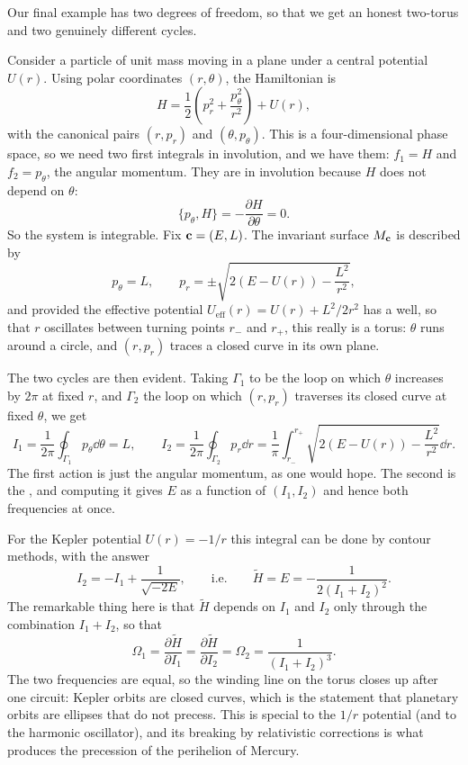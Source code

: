 \documentclass[a4paper]{scrartcl}
\begin{document}
Our final example has two degrees of freedom, so that we get an honest two-torus and two genuinely different cycles.

\begin{example}
	Consider a particle of unit mass moving in a plane under a central potential $U(r)$. Using polar coordinates $(r, \theta)$, the Hamiltonian is
	$$
	H = \frac{1}{2}\left(p_r^2 + \frac{p_\theta^2}{r^2}\right) + U(r),
	$$
	with the canonical pairs $(r, p_r)$ and $(\theta, p_\theta)$. This is a four-dimensional phase space, so we need two first integrals in involution, and we have them: $f_1 = H$ and $f_2 = p_\theta$, the angular momentum. They are in involution because $H$ does not depend on $\theta$:
	$$
	\{p_\theta, H\} = -\frac{\partial H}{\partial \theta} = 0.
	$$
	So the system is integrable. Fix $\mathbf{c} = (E, L)$. The invariant surface $M_{\mathbf{c}}$ is described by
	$$
	p_\theta = L, \qquad p_r = \pm\sqrt{2(E - U(r)) - \frac{L^2}{r^2}},
	$$
	and provided the effective potential $U_{\text{eff}}(r) = U(r) + L^2/2r^2$ has a well, so that $r$ oscillates between turning points $r_-$ and $r_+$, this really is a torus: $\theta$ runs around a circle, and $(r, p_r)$ traces a closed curve in its own plane.

	The two cycles are then evident. Taking $\Gamma_1$ to be the loop on which $\theta$ increases by $2\pi$ at fixed $r$, and $\Gamma_2$ the loop on which $(r, p_r)$ traverses its closed curve at fixed $\theta$, we get
	$$
	I_1 = \frac{1}{2\pi}\oint_{\Gamma_1}p_\theta\dd\theta = L, \qquad
	I_2 = \frac{1}{2\pi}\oint_{\Gamma_2}p_r\dd r = \frac{1}{\pi}\int_{r_-}^{r_+}\sqrt{2(E-U(r)) - \frac{L^2}{r^2}}\dd r.
	$$
	The first action is just the angular momentum, as one would hope. The second is the , and computing it gives $E$ as a function of $(I_1, I_2)$ and hence both frequencies at once.

	For the Kepler potential $U(r) = -1/r$ this integral can be done by contour methods, with the answer
	$$
	I_2 = -I_1 + \frac{1}{\sqrt{-2E}}, \qquad \text{i.e.} \qquad \tilde H = E = -\frac{1}{2(I_1+I_2)^2}.
	$$
	The remarkable thing here is that $\tilde H$ depends on $I_1$ and $I_2$ only through the combination $I_1 + I_2$, so that
	$$
	\Omega_1 = \frac{\partial\tilde H}{\partial I_1} = \frac{\partial\tilde H}{\partial I_2} = \Omega_2 = \frac{1}{(I_1+I_2)^3}.
	$$
	The two frequencies are equal, so the winding line on the torus closes up after one circuit: Kepler orbits are closed curves, which is the statement that planetary orbits are ellipses that do not precess. This  is special to the $1/r$ potential (and to the harmonic oscillator), and its breaking by relativistic corrections is what produces the precession of the perihelion of Mercury.
\end{example}
\end{document}
